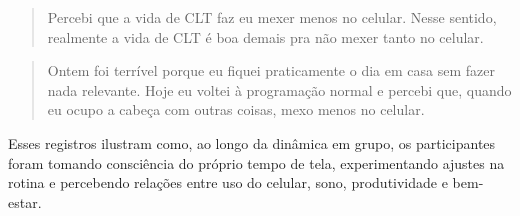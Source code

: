 \begin{quote}
Percebi que a vida de CLT faz eu mexer menos no celular. Nesse sentido, realmente a vida de CLT é boa demais pra não mexer tanto no celular.
\end{quote}

\begin{quote}
Ontem foi terrível porque eu fiquei praticamente o dia em casa sem fazer nada relevante. Hoje eu voltei à programação normal e percebi que, quando eu ocupo a cabeça com outras coisas, mexo menos no celular.
\end{quote}

Esses registros ilustram como, ao longo da dinâmica em grupo, os participantes foram tomando consciência do próprio tempo de tela, experimentando ajustes na rotina e percebendo relações entre uso do celular, sono, produtividade e bem-estar.